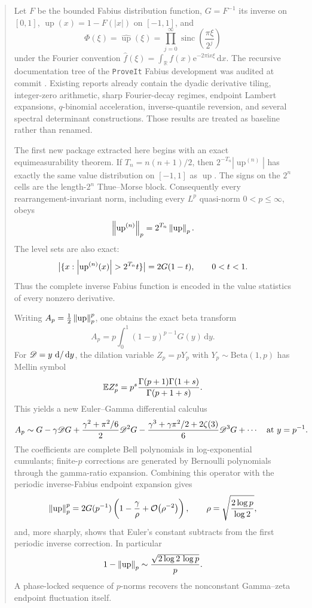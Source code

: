 \documentclass[11pt,oneside]{article}
\theoremstyle{definition}
\theoremstyle{remark}
\newcommand{\R}{\mathbb R}
\newcommand{\Up}{\operatorname{up}}
\newcommand{\sinc}{\operatorname{sinc}}
\newcommand{\e}{\mathrm e}
\newcommand{\ii}{\mathrm i}
\newcommand{\dd}{\,\mathrm d}
\newcommand{\bigO}{\mathcal O}
\begin{document}
\begin{abstract}
Let $F$ be the bounded Fabius distribution function, $G=F^{-1}$ its inverse on
$[0,1]$, $\Up(x)=1-F(|x|)$ on $[-1,1]$, and
\[
 \Phi(\xi)=\widehat{\Up}(\xi)
 =\prod_{j=0}^{\infty}\sinc\!\left(\frac{\pi\xi}{2^j}\right)
\]
under the Fourier convention
$\widehat f(\xi)=\int_{\R}f(x)\e^{-2\pi\ii x\xi}\dd x$.
The recursive documentation tree of the \texttt{ProveIt} Fabius development was audited at
commit \RepoCommit.  Existing reports already contain the dyadic derivative tiling,
integer-zero arithmetic, sharp Fourier-decay regimes, endpoint Lambert expansions,
$q$-binomial acceleration, inverse-quantile reversion, and several spectral determinant
constructions.  Those results are treated as baseline rather than renamed.

The first new package extracted here begins with an exact equimeasurability theorem.  If
$T_n=n(n+1)/2$, then $2^{-T_n}|\Up^{(n)}|$ has exactly the same value distribution on
$[-1,1]$ as $\Up$.  The signs on the $2^n$ cells are the length-$2^n$ Thue--Morse block.
Consequently every rearrangement-invariant norm, including every $L^p$ quasi-norm
$0<p\leq\infty$, obeys
\[
 \norm{\Up^{(n)}}_p=2^{T_n}\norm{\Up}_p.
\]
The level sets are also exact:
\[
 \bigl|\{x:\abs{\Up^{(n)}(x)}>2^{T_n}t\}\bigr|=2G(1-t),
 \qquad 0<t<1.
\]
Thus the complete inverse Fabius function is encoded in the value statistics of every
nonzero derivative.

Writing
$A_p=\tfrac12\norm{\Up}_p^p$, one obtains the exact beta transform
\[
 A_p=p\int_0^1(1-y)^{p-1}G(y)\dd y.
\]
For $\Dop=y\,\dd/\dd y$, the dilation variable $Z_p=pY_p$ with
$Y_p\sim\mathrm{Beta}(1,p)$ has Mellin symbol
\[
 \E Z_p^s=p^s\frac{\Gamma(p+1)\Gamma(1+s)}{\Gamma(p+1+s)}.
\]
This yields a new Euler--Gamma differential calculus
\[
 A_p\sim
 G-\gamma\Dop G
 +\frac{\gamma^2+\pi^2/6}{2}\Dop^2G
 -\frac{\gamma^3+\gamma\pi^2/2+2\zeta(3)}{6}\Dop^3G+\cdots
 \quad\text{at }y=p^{-1}.
\]
The coefficients are complete Bell polynomials in log-exponential cumulants; finite-$p$
corrections are generated by Bernoulli polynomials through the gamma-ratio expansion.
Combining this operator with the periodic inverse-Fabius endpoint expansion gives
\[
 \norm{\Up}_p^p
 =2G(p^{-1})\left(1-\frac{\gamma}{\rho}
 +\bigO\!\left(\rho^{-2}\right)\right),
 \qquad
 \rho=\sqrt{\frac{2\log p}{\log2}},
\]
and, more sharply, shows that Euler's constant subtracts from the first periodic inverse
correction.  In particular
\[
 1-\norm{\Up}_p\sim\frac{\sqrt{2\log2\,\log p}}{p}.
\]
A phase-locked sequence of $p$-norms recovers the nonconstant Gamma--zeta endpoint
fluctuation itself.


\end{abstract}
\end{document}
